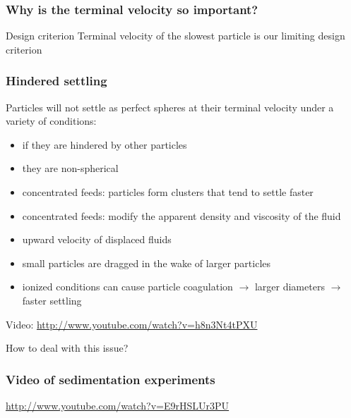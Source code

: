 \begin{frame}\frametitle{Why is the terminal velocity so important?}
	\begin{exampleblock}{Design criterion}
		Terminal velocity of the slowest particle is our limiting design criterion
	\end{exampleblock}
\end{frame}

\begin{frame}\frametitle{Hindered settling}
	Particles will not settle as perfect spheres at their terminal velocity under a variety of conditions:
	\begin{itemize}
		\item	if they are hindered by other particles
		\item	they are non-spherical
		\item	concentrated feeds: particles form clusters that tend to settle faster
		\item	concentrated feeds: modify the apparent density and viscosity of the fluid
		\item	upward velocity of displaced fluids
		\item	small particles are dragged in the wake of larger particles
		\item	ionized conditions can cause particle coagulation $\rightarrow$ larger diameters $\rightarrow$ faster settling
	\end{itemize}
	
	\vspace{12pt}
	Video: \href{http://www.youtube.com/watch?v=h8n3Nt4tPXU}{http://www.youtube.com/watch?v=h8n3Nt4tPXU}
	
	How to deal with this issue?
\end{frame}

\begin{frame}\frametitle{Video of sedimentation experiments}
	\href{http://www.youtube.com/watch?v=E9rHSLUr3PU}{http://www.youtube.com/watch?v=E9rHSLUr3PU}
\end{frame}

